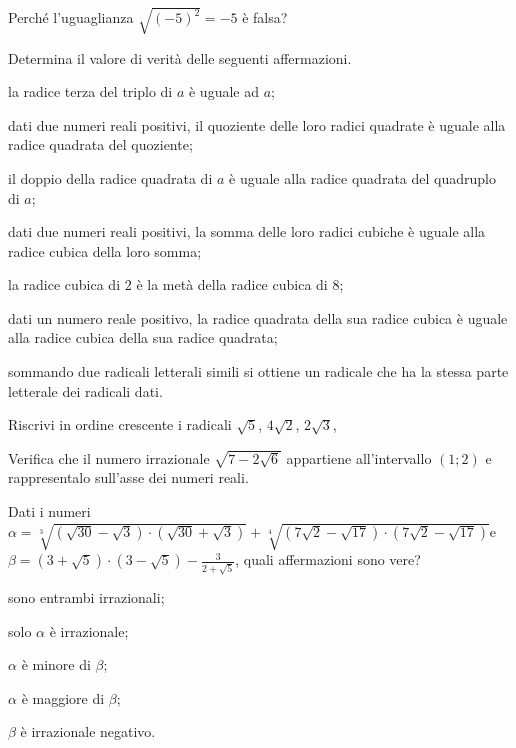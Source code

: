 \begin{esercizio}%
Perché l'uguaglianza $\sqrt{(-5)^2}=-5$ è falsa?
\end{esercizio}

\begin{esercizio}%
Determina il valore di verità delle seguenti affermazioni.
\begin{enumeratea}
 \item la radice terza del triplo di $a$ è uguale ad $a$;
 \item dati due numeri reali positivi, il quoziente delle loro radici quadrate è uguale alla radice quadrata del quoziente;
 \item il doppio della radice quadrata di $a$ è uguale alla radice quadrata del quadruplo di $a$;
 \item dati due numeri reali positivi, la somma delle loro radici cubiche è uguale alla radice cubica della loro somma;
 \item la radice cubica di $2$ è la metà della radice cubica di $8$;
 \item dati un numero reale positivo, la radice quadrata della sua radice cubica è uguale alla radice cubica della sua radice quadrata;
 \item sommando due radicali letterali simili si ottiene un radicale che ha la stessa parte letterale dei radicali dati.
\end{enumeratea}
\end{esercizio}

\begin{esercizio}%
Riscrivi in ordine crescente i radicali $\sqrt 5$, $4\sqrt 2$, $2\sqrt 3$,
\end{esercizio}

\begin{esercizio}%
Verifica che il numero irrazionale $\sqrt{7-2\sqrt 6}$ appartiene all'intervallo $(1; 2)$ e rappresentalo sull'asse dei numeri reali.
\end{esercizio}

\begin{esercizio}%
Dati i numeri\quad $\alpha =\sqrt[3]{(\sqrt{30}-\sqrt 3)\cdot (\sqrt{30}+\sqrt 3)}+\sqrt[4]{(7\sqrt 2-\sqrt{17})\cdot (7\sqrt 2-\sqrt{17})}$\quad e $\beta =(3+\sqrt 5)\cdot (3-\sqrt 5)-\frac 3{2+\sqrt 5}$, quali affermazioni sono vere?
\begin{multicols}{2}
\begin{enumeratea}
 \item sono entrambi irrazionali;
 \item solo $\alpha$ è irrazionale;
 \item $\alpha$ è minore di $\beta$;
 \item $\alpha$ è maggiore di $\beta$;
 \item $\beta$ è irrazionale negativo.
\end{enumeratea}
\end{multicols}
\end{esercizio}

